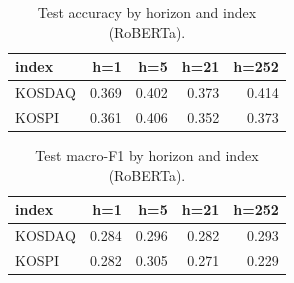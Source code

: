 \begin{table}[t]\centering
\caption{Test accuracy by horizon and index (RoBERTa).}
\begin{tabular}{lrrrr}
\toprule
index & h=1 & h=5 & h=21 & h=252 \\
\midrule
KOSDAQ & 0.369 & 0.402 & 0.373 & 0.414 \\
KOSPI & 0.361 & 0.406 & 0.352 & 0.373 \\
\bottomrule
\end{tabular}
\end{table}

\begin{table}[t]\centering
\caption{Test macro-F1 by horizon and index (RoBERTa).}
\begin{tabular}{lrrrr}
\toprule
index & h=1 & h=5 & h=21 & h=252 \\
\midrule
KOSDAQ & 0.284 & 0.296 & 0.282 & 0.293 \\
KOSPI & 0.282 & 0.305 & 0.271 & 0.229 \\
\bottomrule
\end{tabular}
\end{table}